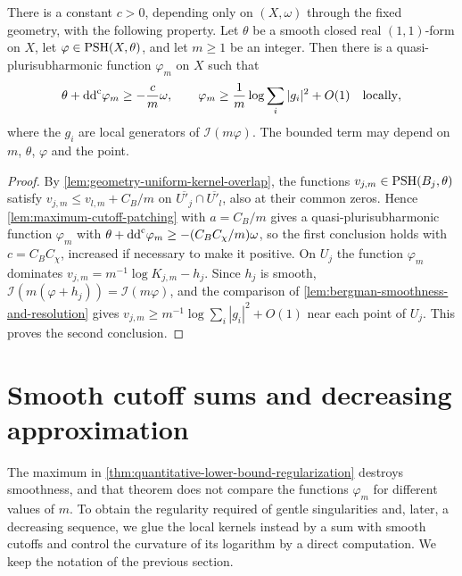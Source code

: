 \begin{theorem}\label{thm:quantitative-lower-bound-regularization}
There is a constant $c>0$, depending only on $(X,\omega)$ through the fixed geometry, with the following property. Let $\theta$ be a smooth closed real $(1,1)$-form on $X$, let $\varphi\in\mathrm{PSH}(X,\theta)$, and let $m\geq1$ be an integer. Then there is a quasi-plurisubharmonic function $\varphi_m$ on $X$ such that
\[
 \theta+\mathrm{dd}^{\mathrm{c}}\varphi_m\geq-\frac cm\omega,
 \qquad
 \varphi_m\geq\frac1m\log\sum_i|g_i|^2+O(1)\quad\text{locally},
\]
where the $g_i$ are local generators of $\mathcal I(m\varphi)$. The bounded term may depend on $m$, $\theta$, $\varphi$ and the point.
\end{theorem}
\begin{proof}
By \cref{lem:geometry-uniform-kernel-overlap}, the functions $v_{j,m}\in\mathrm{PSH}(B_j,\theta)$ satisfy $v_{j,m}\leq v_{l,m}+C_B/m$ on $\overline{U'_j}\cap\overline{U'_l}$, also at their common zeros. Hence \cref{lem:maximum-cutoff-patching} with $a=C_B/m$ gives a quasi-plurisubharmonic function $\varphi_m$ with $\theta+\mathrm{dd}^{\mathrm{c}}\varphi_m\geq-(C_BC_\chi/m)\omega$, so the first conclusion holds with $c=C_BC_\chi$, increased if necessary to make it positive. On $U_j$ the function $\varphi_m$ dominates $v_{j,m}=m^{-1}\log K_{j,m}-h_j$. Since $h_j$ is smooth, $\mathcal I(m(\varphi+h_j))=\mathcal I(m\varphi)$, and the comparison of \cref{lem:bergman-smoothness-and-resolution} gives $v_{j,m}\geq m^{-1}\log\sum_i|g_i|^2+O(1)$ near each point of $U_j$. This proves the second conclusion.
\end{proof}

\section{Smooth cutoff sums and decreasing approximation}
\label{sec:gentle-decreasing-approximation}

The maximum in \cref{thm:quantitative-lower-bound-regularization} destroys smoothness, and that theorem does not compare the functions $\varphi_m$ for different values of $m$. To obtain the regularity required of gentle singularities and, later, a decreasing sequence, we glue the local kernels instead by a sum with smooth cutoffs and control the curvature of its logarithm by a direct computation. We keep the notation of the previous section.

